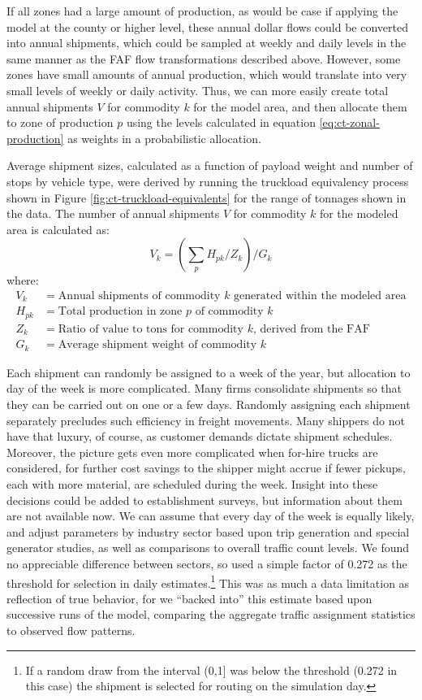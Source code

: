 If all zones had a large amount of production, as would be case if applying the model at the county or higher level, these annual dollar flows could be converted into annual shipments, which could be sampled at weekly and daily levels in the same manner as the FAF flow transformations described above. However, some zones have small amounts of annual production, which would translate into very small levels of weekly or daily activity. Thus, we can more easily create total annual shipments $V$ for commodity $k$ for the model area, and then allocate them to zone of production $p$ using the levels calculated in equation \ref{eq:ct-zonal-production} as weights in a probabilistic allocation.

Average shipment sizes, calculated as a function of payload weight and number of stops by vehicle type, were derived by running the truckload equivalency process shown in Figure \ref{fig:ct-truckload-equivalents} for the range of tonnages shown in the data. The number of annual shipments $V$ for commodity $k$ for the modeled area is calculated as:
\begin{equation}
V_k = \left ( \sum_p H_{pk} / Z_k \right ) / G_k
\end{equation}
\noindent where:
\begin{align*}
V_k &= \text{Annual shipments of commodity $k$ generated within the modeled area} \\
H_{pk} &= \text{Total production in zone $p$ of commodity $k$} \\
Z_k &= \text{Ratio of value to tons for commodity $k$, derived from the FAF} \\
G_k &= \text{Average shipment weight of commodity $k$}
\end{align*}

Each shipment can randomly be assigned to a week of the year, but allocation to day of the week is more complicated. Many firms consolidate shipments so that they can be carried out on one or a few days. Randomly assigning each shipment separately precludes such efficiency in freight movements. Many shippers do not have that luxury, of course, as customer demands dictate shipment schedules. Moreover, the picture gets even more complicated when for-hire trucks are considered, for further cost savings to the shipper might accrue if fewer pickups, each with more material, are scheduled during the week. Insight into these decisions could be added to establishment surveys, but information about them are not available now. We can assume that every day of the week is equally likely, and adjust parameters by industry sector based upon trip generation and special generator studies, as well as comparisons to overall traffic count levels. We found no appreciable difference between sectors, so used a simple factor of 0.272 as the threshold for selection in daily estimates.\footnote{If a random draw from the interval (0,1] was below the threshold (0.272 in this case) the shipment is selected for routing on the simulation day.} This was as much a data limitation as reflection of true behavior, for we ``backed into'' this estimate based upon successive runs of the model, comparing the aggregate traffic assignment statistics to observed flow patterns.


